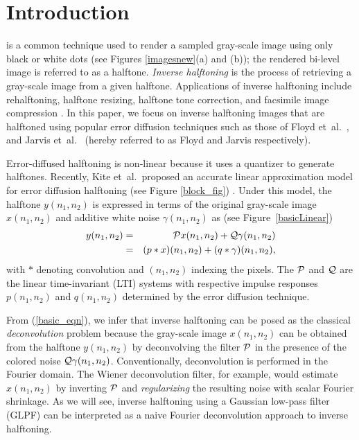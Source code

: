 \documentclass[11pt]{article}
\def\nnnx {n_1}
\def\nnny {n_2}
\newcommand{\nn} {\nonumber}
\def\cP { {\cal{P}} }
\def\cQ { {\cal{Q}} }
\begin{document}
\section{Introduction}
\label{Intro}

 is a common technique used to render
a sampled gray-scale image using only black or white dots
\cite{Ulichney} (see Figures \ref{imagesnew}(a) and (b)); the rendered
bi-level image is referred to as a halftone. {\em Inverse halftoning}
is the process of retrieving a gray-scale image from a given
halftone. Applications of inverse halftoning include rehalftoning,
halftone resizing, halftone tone correction, and facsimile image
compression \cite{kernel_halftoning,halftoning_applications}. In this
paper, we focus on inverse halftoning images that are halftoned using
popular error diffusion techniques such as those of Floyd et~al.\
\cite{Floyd}, and Jarvis et~al.\ \cite{Jarvis} (hereby referred to as
Floyd and Jarvis respectively).




Error-diffused halftoning is non-linear because it uses a quantizer to
generate halftones.  Recently, Kite et~al.\ proposed an accurate
linear approximation model for error diffusion halftoning (see Figure
\ref{block_fig}) \cite{Kite,KiteJournal}. Under this model, the
halftone $y(\nnnx,\nnny)$ is expressed in terms of the original
gray-scale image $x(\nnnx,\nnny)$ and additive white noise
$\gamma(\nnnx,\nnny)$ as (see Figure~\ref{basicLinear})
\begin{eqnarray}
y(\nnnx,\nnny) &=& \cP x(\nnnx,\nnny) + \cQ
\gamma(\nnnx,\nnny) \nn\\ &=&(p\ast x)(\nnnx,\nnny) + (q\ast\gamma)(\nnnx,\nnny),
\label{basic_eqn}
\end{eqnarray}
with $\ast$ denoting convolution and $(\nnnx,\nnny)$ indexing the pixels.
The $\cP$ and $\cQ$ are the linear time-invariant (LTI) systems with
respective impulse responses $p(\nnnx,\nnny)$ and $q(\nnnx,\nnny)$ determined
by the error diffusion technique.

From (\ref{basic_eqn}), we infer that inverse halftoning can be posed
as the classical {\em deconvolution} problem because the gray-scale
image $x(\nnnx,\nnny)$ can be obtained from the halftone
$y(\nnnx,\nnny)$ by deconvolving the filter $\cP$ in the presence of
the colored noise $\cQ \gamma(\nnnx,\nnny)$.  Conventionally,
deconvolution is performed in the Fourier domain.  The Wiener
deconvolution filter, for example, would estimate $x(\nnnx,\nnny)$ by
inverting $\cP$ and {\em regularizing} the resulting noise with scalar
Fourier shrinkage.  As we will see, inverse halftoning using a
Gaussian low-pass filter (GLPF) \cite{Gaussian-LPF-halftoning} can be
interpreted as a naive Fourier deconvolution approach to inverse
halftoning.
\end{document}
